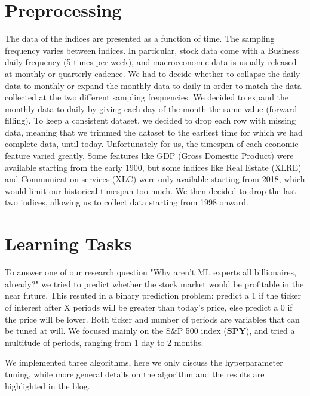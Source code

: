 \documentclass[10pt]{article} %
\begin{document}
\section{Preprocessing}

The data of the indices are presented as a function of time. The sampling frequency varies between indices. In particular, stock data come with a Business daily frequency (5 times per week), and macroeconomic data is usually released at monthly or quarterly cadence. We had to decide whether to collapse the daily data to monthly or expand the monthly data to daily in order to match the data collected at the two different sampling frequencies. We decided to expand the monthly data to daily by giving each day of the month the same value (forward filling). 
To keep a consistent dataset, we decided to drop each row with missing data, meaning that we trimmed the dataset to the earliest time for which we had complete data, until today. Unfortunately for us, the timespan of each economic feature varied greatly. Some features like GDP (Gross Domestic Product) were available starting from the early 1900, but some indices like Real Estate (XLRE) and Communication services (XLC) were only available starting from 2018, which would limit our historical timespan too much. We then decided to drop the last two indices, allowing us to collect data starting from 1998 onward.

\section{Learning Tasks}
To answer one of our research question "Why aren't ML experts all billionaires, already?" we tried to predict whether the stock market would be profitable in the near future. This resuted in a binary prediction problem: predict a 1 if the ticker of interest after X periods will be greater than today's price, else predict a 0 if the price will be lower. Both ticker and number of periods are variables that can be tuned at will. We focused mainly on the S\&P 500 index (\textbf{SPY}), and tried a multitude of periods, ranging from 1 day to 2 months.

We implemented three algorithms, here we only discuss the hyperparameter tuning, while more general details on the algorithm and the results are highlighted in the blog.
\end{document}
